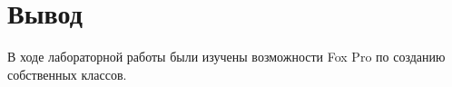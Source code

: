 \section{Вывод}

В ходе лабораторной работы были изучены возможности Fox Pro по созданию собственных классов.

\clearpage
